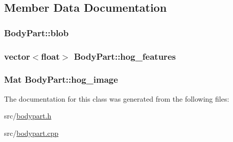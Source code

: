 \subsection{Member Data Documentation}
\hypertarget{class_body_part_a21a062ca3c7c36b43d706c364adaca5d}{
\subsubsection[{blob}]{ {\bf BodyPart::blob}}}
\label{class_body_part_a21a062ca3c7c36b43d706c364adaca5d}
\hypertarget{class_body_part_ade0cc8a87533c1b94de1e2d791524384}{
\subsubsection[{hog\_\-features}]{\setlength{\rightskip}{0pt plus 5cm}vector$<$float$>$ {\bf BodyPart::hog\_\-features}}}
\label{class_body_part_ade0cc8a87533c1b94de1e2d791524384}
\hypertarget{class_body_part_a3c20909c91e11e91f1eb62bda30d4963}{
\subsubsection[{hog\_\-image}]{\setlength{\rightskip}{0pt plus 5cm}Mat {\bf BodyPart::hog\_\-image}}}
\label{class_body_part_a3c20909c91e11e91f1eb62bda30d4963}


The documentation for this class was generated from the following files:\begin{DoxyCompactItemize}
\item 
src/\hyperlink{bodypart_8h}{bodypart.h}\item 
src/\hyperlink{bodypart_8cpp}{bodypart.cpp}\end{DoxyCompactItemize}
